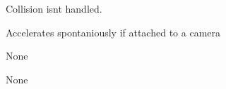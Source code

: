 
\begin{DoxyRefList}
\item[\label{bug__bug000001}%
\hypertarget{bug__bug000001}{}%
File \hyperlink{_autowalk_8cs}{Autowalk.cs} ]Collision isn\textquotesingle{}t handled. 
\item[\label{bug__bug000002}%
\hypertarget{bug__bug000002}{}%
File \hyperlink{_character_motor_8cs}{Character\+Motor.cs} ]Accelerates spontaniously if attached to a camera 
\item[\label{bug__bug000003}%
\hypertarget{bug__bug000003}{}%
File \hyperlink{_f_p_s_input_controller_8cs}{F\+P\+S\+Input\+Controller.cs} ]None 
\item[\label{bug__bug000004}%
\hypertarget{bug__bug000004}{}%
File \hyperlink{_load_on_click_8cs}{Load\+On\+Click.cs} ]None
\end{DoxyRefList}